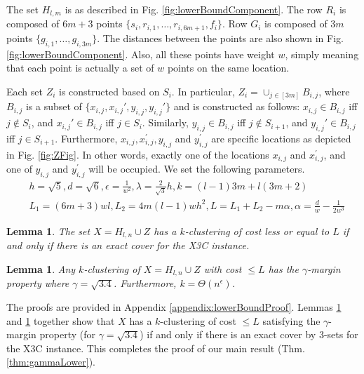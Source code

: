 \documentclass[12pt]{article}
\newtheorem{lemma}[theorem]{Lemma}
\begin{document}
The set $H_{l,m}$ is as described in Fig. \ref{fig:lowerBoundComponent}. The row $R_i$ is composed of $6m + 3$ points $\{s_i, r_{i, 1}, \ldots, r_{i, 6m+1}, f_i\}$. Row $G_i$ is composed of $3m$ points $\{g_{i,1}, \ldots, g_{i, 3m}\}$. The distances between the points are also shown in Fig. \ref{fig:lowerBoundComponent}. Also, all these points have weight $w$, simply meaning that each point is actually a set of $w$ points on the same location.

Each set $Z_i$ is constructed based on $S_i$. In particular, $Z_i = \cup_{j\in [3m]} B_{i,j}$, where $B_{i,j}$ is a subset of $\{x_{i,j},x_{i,j}',y_{i,j},y_{i,j}'\}$ and is constructed as follows: $x_{i,j} \in B_{i,j}$ iff $j \not\in S_i$, and $x_{i,j}' \in B_{i,j}$ iff $j \in S_i$. Similarly,  $y_{i,j} \in B_{i,j}$ iff $j \not\in S_{i+1}$, and $y_{i,j}' \in B_{i,j}$ iff $j \in S_{i+1}$. Furthermore, $x_{i, j}, x_{i,j}^\prime, y_{i,j}$ and $y_{i, j}^\prime$ are specific locations as depicted in Fig. \ref{fig:ZFig}. In other words, exactly one of the locations $x_{i,j}$ and $x_{i,j}^\prime$, and one of $y_{i,j}$ and $y_{i,j}^\prime$ will be occupied. We set the following parameters. 
\vspace{-0.1in}
\begin{align*}
&h = \sqrt{5}, d = \sqrt{6}, \epsilon = \frac{1}{w^2}, \lambda = \frac{2}{\sqrt{3}}h, k = (l-1)3m + l(3m+2)\\
& L_1 = (6m+3)wl, L_2 = 4m(l-1)wh^2, L = L_1 + L_2 - m\alpha, \alpha = \frac{d}{w}-\frac{1}{2w^3}
\end{align*}


\begin{lemma}
\label{lemma:kmeansEquivalenceX3C}
The set $X = H_{l,n} \cup Z$ has a $k$-clustering of cost less or equal to $L$ if and only if there is an exact cover for the X3C instance.
\end{lemma}

\begin{lemma}
\label{lemma:gammaLower}
Any $k$-clustering of $X = H_{l,n} \cup Z$ with cost $\le L$ has the $\gamma$-margin property where $\gamma = \sqrt{3.4}$. Furthermore, $k = \Theta(n^{\epsilon})$.
\end{lemma}

The proofs are provided in Appendix \ref{appendix:lowerBoundProof}. Lemmas \ref{lemma:kmeansEquivalenceX3C} and \ref{lemma:gammaLower} together show that $X$ has a $k$-clustering of cost $\le L$ satisfying the $\gamma$-margin property (for $\gamma = \sqrt{3.4}$) if and only if there is an exact cover by $3$-sets for the X3C instance. This completes the proof of our main result (Thm. \ref{thm:gammaLower}). 
\end{document}
